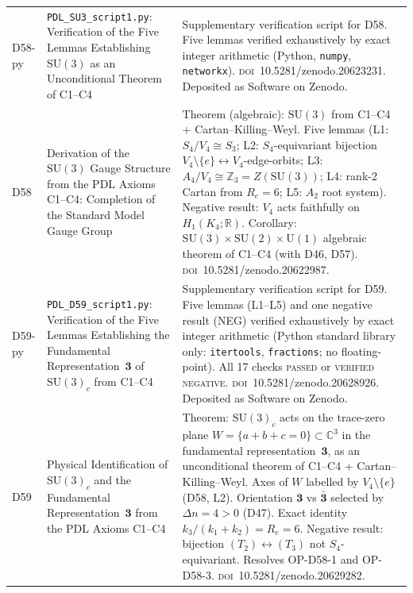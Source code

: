 \documentclass[11pt,a4paper]{article}
\theoremstyle{plain}
\theoremstyle{definition}
\theoremstyle{remark}
\begin{document}
\begin{longtable}{L{1.3cm}L{3.8cm}L{8.0cm}}
D58-py & \texttt{PDL\_SU3\_script1.py}: Verification of the Five Lemmas Establishing $\mathrm{SU}(3)$ as an Unconditional Theorem of C1--C4~\cite{D58py} & Supplementary verification script for D58. Five lemmas verified exhaustively by exact integer arithmetic (Python, \texttt{numpy}, \texttt{networkx}). \textsc{doi}~10.5281/zenodo.20623231. Deposited as Software on Zenodo.\\[0.4em]
D58 & Derivation of the $\mathrm{SU}(3)$ Gauge Structure from the PDL Axioms C1--C4: Completion of the Standard Model Gauge Group~\cite{D58} & \textcolor{proofblue}{Theorem} (algebraic): $\mathrm{SU}(3)$ from C1--C4 + Cartan--Killing--Weyl. Five lemmas (L1: $S_4/V_4\cong S_3$; L2: $S_4$-equivariant bijection $V_4\setminus\{e\}\leftrightarrow V_4$-edge-orbits; L3: $A_4/V_4\cong\mathbb{Z}_3 = Z(\mathrm{SU}(3))$; L4: rank-2 Cartan from $R_e=6$; L5: $A_2$ root system). Negative result: $V_4$ acts faithfully on $H_1(K_4;\mathbb{R})$. Corollary: $\mathrm{SU}(3)\times\mathrm{SU}(2)\times\mathrm{U}(1)$ algebraic theorem of C1--C4 (with D46, D57). \textsc{doi}~10.5281/zenodo.20622987.\\[0.4em]
D59-py & \texttt{PDL\_D59\_script1.py}: Verification of the Five Lemmas Establishing the Fundamental Representation~$\mathbf{3}$ of $\mathrm{SU}(3)_c$ from C1--C4~\cite{D59py} & Supplementary verification script for D59. Five lemmas (L1--L5) and one negative result (NEG) verified exhaustively by exact integer arithmetic (Python standard library only: \texttt{itertools}, \texttt{fractions}; no floating-point). All 17 checks \textsc{passed} or \textsc{verified negative}. \textsc{doi}~10.5281/zenodo.20628926. Deposited as Software on Zenodo.\\[0.4em]
D59 & Physical Identification of $\mathrm{SU}(3)_c$ and the Fundamental Representation~$\mathbf{3}$ from the PDL Axioms C1--C4~\cite{D59} & \textcolor{proofblue}{Theorem}: $\mathrm{SU}(3)_c$ acts on the trace-zero plane $W = \{a+b+c=0\}\subset\mathbb{C}^3$ in the fundamental representation~$\mathbf{3}$, as an unconditional theorem of C1--C4 + Cartan--Killing--Weyl. Axes of $W$ labelled by $V_4\setminus\{e\}$ (D58, L2). Orientation $\mathbf{3}$ vs $\bar{\mathbf{3}}$ selected by $\Delta n = 4 > 0$ (D47). Exact identity $k_3/(k_1+k_2) = R_e = 6$. Negative result: bijection $(T_2)\leftrightarrow(T_3)$ not $S_4$-equivariant. Resolves OP-D58-1 and OP-D58-3. \textsc{doi}~10.5281/zenodo.20629282.\\[0.4em]

\end{longtable}
\end{document}
